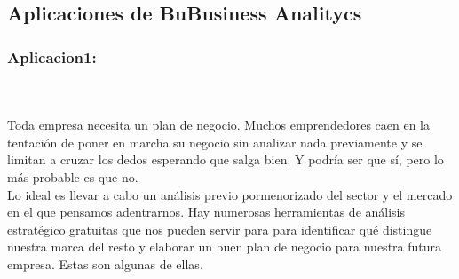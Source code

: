 \subsection{Aplicaciones de BuBusiness Analitycs } \label{sec:nada}


\subsubsection{Aplicacion1: }\label{sec:nada2}  

\begin{center}
\caption\textbf{HERRAMIENTAS DE BUSINESS ANALITYCS}
\end{center}
\\
\\
Toda empresa necesita un plan de negocio. Muchos emprendedores caen en la tentación de poner en marcha su negocio sin analizar nada previamente y se limitan a cruzar los dedos esperando que salga bien. Y podría ser que sí, pero lo más probable es que no.\\
Lo ideal es llevar a cabo un análisis previo pormenorizado del sector y el mercado en el que pensamos adentrarnos. Hay numerosas herramientas de análisis estratégico gratuitas que nos pueden servir para para identificar qué distingue nuestra marca del resto y elaborar un buen plan de negocio para nuestra futura empresa. Estas son algunas de ellas.  
\\
